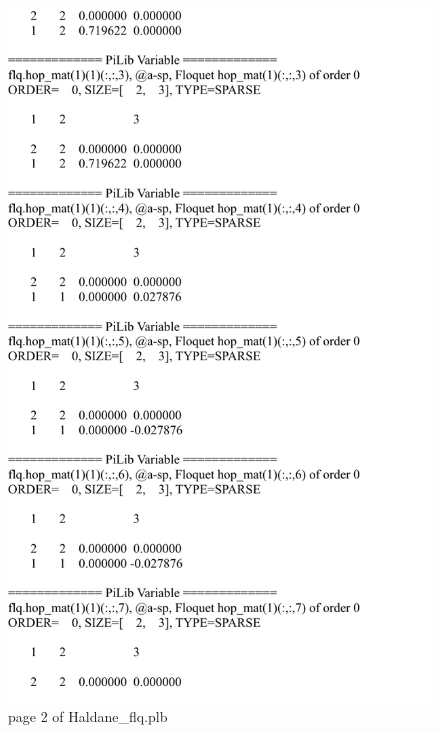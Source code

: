 \documentclass[10pt,a4paper]{article}
\begin{document}
\begin{figure}[tbp]
\centering
\includegraphics[width=0.85\columnwidth]{Haldane_flq_p2.pdf}
\caption{page 2 of Haldane\_flq.plb}
\end{figure}
\end{document}
